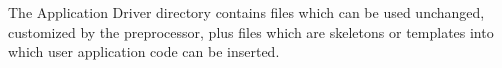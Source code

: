 %


The Application Driver directory contains files which can be used
unchanged, customized by the preprocessor, plus files which are
skeletons or templates into which user application code can be inserted.


